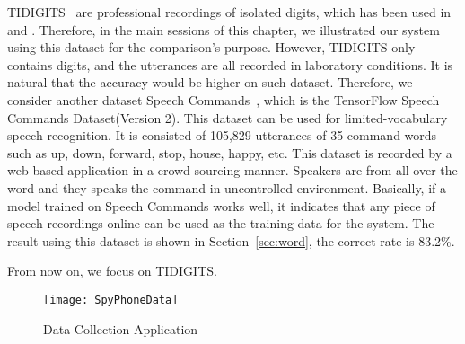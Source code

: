 TIDIGITS~\cite{leonard1993tidigits} are professional recordings of isolated digits, which has been used in~\cite{michalevsky2014gyrophone} and \cite{anand2019spearphone}. Therefore, in the main sessions of this chapter, we illustrated our system using this dataset for the comparison's purpose. However, TIDIGITS only contains digits, and the utterances are all recorded in laboratory conditions. It is natural that the accuracy would be higher on such dataset. Therefore, we consider another dataset Speech Commands~\cite{warden2018speech}, which  is the TensorFlow Speech Commands Dataset(Version 2). This dataset can be used for limited-vocabulary speech recognition. It is consisted of 105,829 utterances of 35 command words such as up, down, forward, stop, house, happy, etc. This dataset is recorded by a web-based application in a crowd-sourcing manner. Speakers are from all over the word and they speaks the command in uncontrolled environment. Basically, if a model trained on Speech Commands works well, it indicates that any piece of speech recordings online can be used as the training data for the {\systemName} system. The result using this dataset is shown in Section~\ref{sec:word}, the correct rate is 83.2\%.



From now on, we focus on TIDIGITS.


\begin{figure}[H]
	\centering
	\texttt{[image: SpyPhoneData]}
	\caption{{\spp} Data Collection Application}
	\label{fig:spyphoneapp}
\end{figure}

